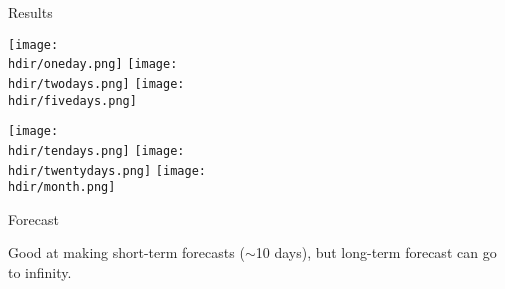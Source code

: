 \documentclass[xcolor=table]{beamer}
\newcommand{\hdir}{.}
\begin{document}
\begin{frame}{Results}
	 
	\hspace*{-1.1cm}
	\vspace*{0cm}
	 	\centering
   	 	\texttt{[image: \\hdir/oneday.png]}
   	 	\hspace*{-0.2cm}
   	 	\texttt{[image: \\hdir/twodays.png]}
   	 	\hspace*{-0.2cm}
   	 	\texttt{[image: \\hdir/fivedays.png]}

   	\hspace*{-1.1cm}
   	\vspace{1cm}
   	 	\centering
   	 	\texttt{[image: \\hdir/tendays.png]}
   	 	\hspace*{-0.2cm}
   	 	\texttt{[image: \\hdir/twentydays.png]}
   	 	\hspace*{-0.2cm}
   	 	\texttt{[image: \\hdir/month.png]}


\end{frame}
\begin{frame}{Forecast}
	\begin{figure}[!h]
	 \end{figure}
	
	Good at making short-term forecasts ($\sim$10 days), but long-term forecast can go to infinity.

\end{frame}
\end{document}
